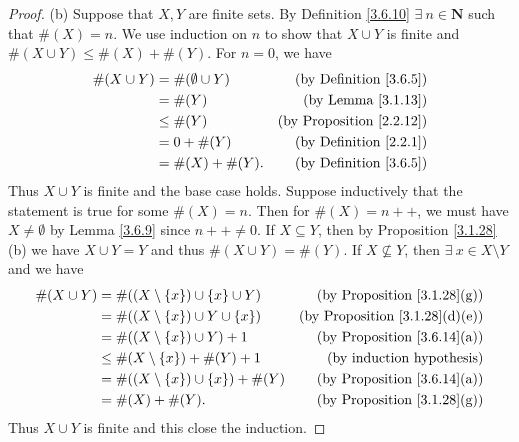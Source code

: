 \begin{proof}{(b)}
Suppose that \(X, Y\) are finite sets.
By Definition \ref{3.6.10} \(\exists\ n \in \mathbf{N}\) such that \(\#(X) = n\).
We use induction on \(n\) to show that \(X \cup Y\) is finite and \(\#(X \cup Y) \leq \#(X) + \#(Y)\).
For \(n = 0\), we have
\begin{align*}
\#(X \cup Y) &= \#(\emptyset \cup Y) & \text{(by Definition \ref{3.6.5})} \\
&= \#(Y) & \text{(by Lemma \ref{3.1.13})} \\
&\leq \#(Y) & \text{(by Proposition \ref{2.2.12})} \\
&= 0 + \#(Y) & \text{(by Definition \ref{2.2.1})} \\
&= \#(X) + \#(Y). & \text{(by Definition \ref{3.6.5})}
\end{align*}
Thus \(X \cup Y\) is finite and the base case holds.
Suppose inductively that the statement is true for some \(\#(X) = n\).
Then for \(\#(X) = n++\), we must have \(X \neq \emptyset\) by Lemma \ref{3.6.9} since \(n++ \neq 0\).
If \(X \subseteq Y\), then by Proposition \ref{3.1.28}(b) we have \(X \cup Y = Y\) and thus \(\#(X \cup Y) = \#(Y)\).
If \(X \not\subseteq Y\), then \(\exists\ x \in X \setminus Y\) and we have
\begin{align*}
\#(X \cup Y) &= \#((X \setminus \{x\}) \cup \{x\} \cup Y) & \text{(by Proposition \ref{3.1.28}(g))} \\
&= \#((X \setminus \{x\}) \cup Y \cup \{x\}) & \text{(by Proposition \ref{3.1.28}(d)(e))} \\
&= \#((X \setminus \{x\}) \cup Y) + 1 & \text{(by Proposition \ref{3.6.14}(a))} \\
&\leq \#(X \setminus \{x\}) + \#(Y) + 1 & \text{(by induction hypothesis)} \\
&= \#((X \setminus \{x\}) \cup \{x\}) + \#(Y) & \text{(by Proposition \ref{3.6.14}(a))} \\
&= \#(X) + \#(Y). & \text{(by Proposition \ref{3.1.28}(g))}
\end{align*}
Thus \(X \cup Y\) is finite and this close the induction.


\end{proof}
